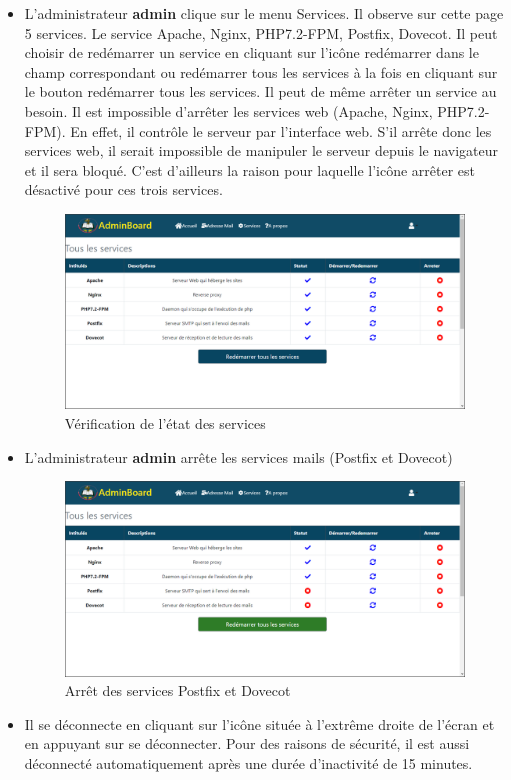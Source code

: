 \documentclass[a4paper,12pt,french]{report} %
\begin{document}
\begin{itemize}
\item L'administrateur \textbf{admin}  clique sur le menu Services. Il observe sur cette page 5 services. Le service Apache, Nginx, PHP7.2-FPM, Postfix, Dovecot. Il peut choisir de redémarrer un service en cliquant sur l'icône redémarrer dans le champ correspondant ou redémarrer tous les services à la fois en cliquant sur le bouton redémarrer tous les services. Il peut de même arrêter un service au besoin. Il est impossible d'arrêter les services web (Apache, Nginx, PHP7.2-FPM). En effet, il contrôle le serveur par l'interface web. S'il arrête donc les services web, il serait impossible de manipuler le serveur depuis le navigateur et il sera bloqué. C'est d'ailleurs la raison pour laquelle l'icône arrêter est désactivé pour ces trois services.
\begin{figure}[H]
\centering
\includegraphics[width=483pt]{figure/admin_verify_state_of_service.png}
\caption{Vérification de l'état des services}
\end{figure}  

\item L'administrateur \textbf{admin}  arrête les services mails (Postfix et Dovecot)
\begin{figure}[H]
\centering
\includegraphics[width=483pt]{figure/admin_stop_service_mail.png}
\caption{Arrêt des services Postfix et Dovecot}
\end{figure}  

\item Il se déconnecte en cliquant sur l'icône située à l'extrême droite de l'écran et en appuyant sur se déconnecter. Pour des raisons de sécurité, il est aussi déconnecté automatiquement après une durée d'inactivité de 15 minutes. 
\end{itemize}
\end{document}
